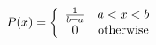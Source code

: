 \documentclass{article}
\begin{document}
\begin{equation}
  P(x)=\left\{
    \begin{array}{cc}
      \frac{1}{b-a}&a<x<b\\
      0&{\rm otherwise}
    \end{array}
  \right .\notag
\end{equation}
\end{document}
